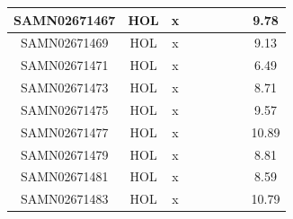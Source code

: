 \documentclass[../main.tex]{subfiles}
\begin{document}
\begin{flushleft}
\begin{footnotesize}
\begin{longtable}{|c|c|c|c|c|c|c|}
    \hline
    SAMN02671467  & HOL   & x                                                            & ~          & ~                                                                           & ~                                                                 & 9.78      \\ 
    \hline
    SAMN02671469  & HOL   & x                                                            & ~          & ~                                                                           & ~                                                                 & 9.13      \\ 
    \hline
    SAMN02671471  & HOL   & x                                                            & ~          & ~                                                                           & ~                                                                 & 6.49      \\ 
    \hline
    SAMN02671473  & HOL   & x                                                            & ~          & ~                                                                           & ~                                                                 & 8.71      \\ 
    \hline
    SAMN02671475  & HOL   & x                                                            & ~          & ~                                                                           & ~                                                                 & 9.57      \\ 
    \hline
    SAMN02671477  & HOL   & x                                                            & ~          & ~                                                                           & ~                                                                 & 10.89     \\ 
    \hline
    SAMN02671479  & HOL   & x                                                            & ~          & ~                                                                           & ~                                                                 & 8.81      \\ 
    \hline
    SAMN02671481  & HOL   & x                                                            & ~          & ~                                                                           & ~                                                                 & 8.59      \\ 
    \hline
    SAMN02671483  & HOL   & x                                                            & ~          & ~                                                                           & ~                                                                 & 10.79     \\ 

\end{longtable}
\end{footnotesize}
\end{flushleft}
\end{document}
